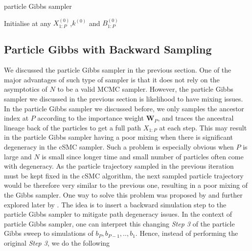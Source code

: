 \documentclass[12pt,a4paper]{article}
\begin{document}
\begin{algorithm}[htb!]
    \caption{particle Gibbs sampler}\label{Alg: PG}
        Initialise at any $X_{1:P}^{(0)}$,$k^{(0)}$ and $B_{1:P}^{(0)}$\;
\end{algorithm}
\subsection{Particle Gibbs with Backward Sampling}
We discussed the particle Gibbs sampler in the previous section. One of the major advantages of such type of sampler is that it does not rely on the asymptotics of \(N\) to be a valid MCMC sampler. However, the particle Gibbs sampler we discussed in the previous section is likelihood to have mixing issues. In the particle Gibbs sampler we discussed before, we only samples the ancestor index at $P$ according to the importance weight $\mathbf{W}_P$, and traces the ancestral lineage back of the particles to get a full path $X_{1:P}$ at each step. This may result in the particle Gibbs sampler having a poor mixing when there is significant degeneracy in the cSMC sampler. Such a problem is especially obvious when $P$ is large and $N$ is small since longer time and small number of particles often come with degeneracy. As the particle trajectory sampled in the previous iteration must be kept fixed in the cSMC algorithm, the next sampled particle trajectory would be therefore very similar to the previous one, resulting in a poor mixing of the Gibbs sampler. One way to solve this problem was proposed by \cite{whiteley2014backwardsampling} and further explored later by \cite{lindsten2012use}. The idea is to insert a backward simulation step to the particle Gibbs sampler to mitigate path degeneracy issues. In the context of particle Gibbs sampler, one can interpret this changing \textit{Step 3} of the particle Gibbs sweep to simulations of \(b_P,b_{P-1},..,b_1\). Hence, instead of performing the original \textit{Step 3}, we do the following
\end{document}

